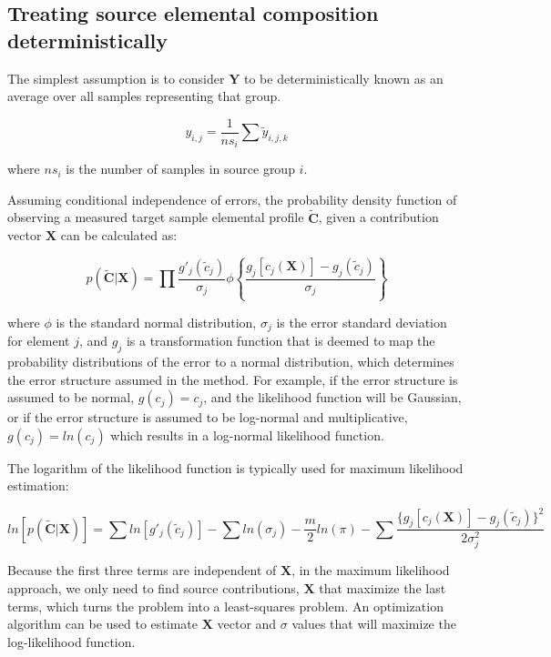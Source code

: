 \subsection{Treating source elemental composition deterministically}

The simplest assumption is to consider $\mathbf{Y}$ to be deterministically known as an average over all samples representing that group.

\begin{equation}\label{eq:y_avg}
    y_{i,j} = \frac{1}{ns_i}\sum \tilde y_{i,j,k}
\end{equation}

where $ns_i$ is the number of samples in source group $i$.

Assuming conditional independence of errors, the probability density function of observing a measured target sample elemental profile $\mathbf{\tilde C}$, given a contribution vector $\mathbf{X}$ can be calculated as:

\begin{equation}
    p(\mathbf{\tilde C}|\mathbf{X}) = \prod \frac{g'_j(\tilde c_j)}{\sigma_j}\phi\left\{\frac{g_j[c_j(\mathbf{X})]-g_j(\tilde c_j)}{\sigma_j}\right\}
\end{equation}

where $\phi$ is the standard normal distribution, $\sigma_j$ is the error standard deviation for element $j$, and $g_j$ is a transformation function that is deemed to map the probability distributions of the error to a normal distribution, which determines the error structure assumed in the method. For example, if the error structure is assumed to be normal, $g(c_j)=c_j$, and the likelihood function will be Gaussian, or if the error structure is assumed to be log-normal and multiplicative, $g(c_j) = ln(c_j)$ which results in a log-normal likelihood function.

The logarithm of the likelihood function is typically used for maximum likelihood estimation:

\begin{equation}\label{eq:loglikelihood}
    ln[p( \mathbf{\tilde C}|\mathbf{X})] = \sum ln[g'_j(\tilde c_j)] - \sum ln(\sigma_j) - \frac{m}{2}ln(\pi) -\sum \frac{\{g_j[c_j(\mathbf{X})]-g_j(\tilde c_j)\}^2}{2\sigma_j^2}
\end{equation}

Because the first three terms are independent of $\mathbf{X}$, in the maximum likelihood approach, we only need to find source contributions, $\mathbf{X}$ that maximize the last terms, which turns the problem into a least-squares problem. An optimization algorithm can be used to estimate $\mathbf{X}$ vector and $\sigma$ values that will maximize the log-likelihood function.

